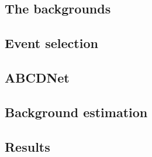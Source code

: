 \subsection{The backgrounds}
\subsection{Event selection}
\subsection{ABCDNet}
\subsection{Background estimation}
\subsection{Results}
